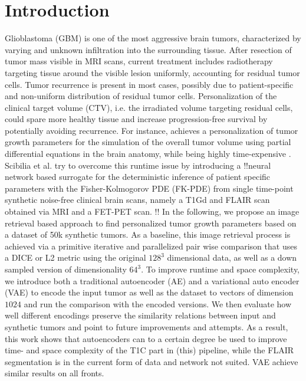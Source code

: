 
\chapter{Introduction}\label{chapter:introduction}

Glioblastoma (GBM) is one of the most aggressive brain tumors, characterized by varying and unknown infiltration into the surrounding tissue. After resection of tumor mass visible in MRI scans, current treatment includes radiotherapy targeting tissue around the visible lesion uniformly, accounting for residual tumor cells. Tumor recurrence is present in most cases, possibly due to patient-specific and non-uniform distribution of residual tumor cells. Personalization of the clinical target volume (CTV), i.e. the irradiated volume targeting residual cells, could spare more healthy tissue and increase progression-free survival by potentially avoiding recurrence. 
For instance,  achieves a personalization of tumor growth parameters for the simulation of the overall tumor volume using partial differential equations in the brain anatomy, while being highly time-expensive . Scibilia et al.  try to overcome this runtime issue by introducing a !!neural network based surrogate for the deterministic inference of patient specific parameters with the Fisher-Kolmogorov PDE (FK-PDE) from single time-point synthetic noise-free clinical brain scans, namely a T1Gd and FLAIR scan obtained via MRI and a FET-PET scan. !! 
In the following, we propose an image retrieval based approach to find personalized tumor growth parameters based on a dataset of 50k synthetic tumors. As a baseline, this image retrieval process is achieved via a primitive iterative and parallelized pair wise comparison that uses a DICE or L2 metric using the original $128^3$ dimensional data, as well as a down sampled version of dimensionality $64^3$. 
To improve runtime and space complexity, we introduce both a traditional autoencoder (AE) and a variational auto encoder (VAE) to encode the input tumor as well as the dataset to vectors of dimension $1024$ and run the comparison with the encoded versions. \newline
We then evaluate how well different encodings preserve the similarity relations between input and synthetic tumors and point to future improvements and attempts. \newline
As a result, this work shows that autoencoders can to a certain degree be used to improve time- and space complexity of the T1C part in (this) pipeline, while the FLAIR segmentation is in the current form of data and network not suited. VAE achieve similar results on all fronts.








